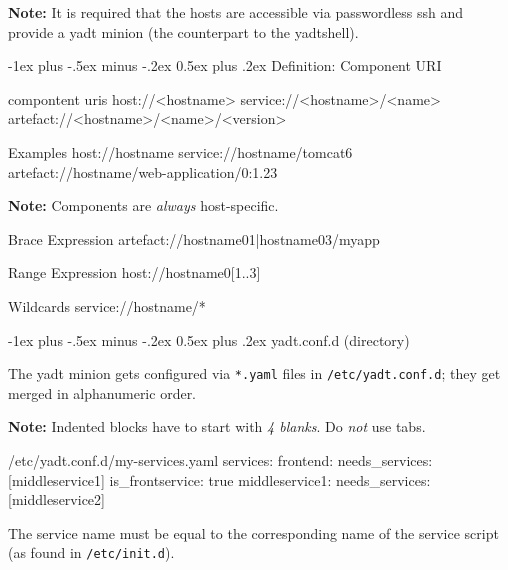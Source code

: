 \documentclass[10pt,landscape]{article}
\makeatletter
\renewcommand{\section}{\@startsection{section}{1}{0mm}%
                                {-1ex plus -.5ex minus -.2ex}%
                                {0.5ex plus .2ex}%
                                {\normalfont\large\bfseries}}
\newcommand{\note}[1]{\medskip\textbf{Note:} {#1}\medskip}
\makeatother
\begin{document}
\begin{multicols}{3}
\note{It is required that the hosts are accessible
via passwordless ssh and provide a yadt minion (the counterpart to the yadtshell).}



\section{Definition: Component URI}

\begin{commands}{compontent uris}
host://<hostname>
service://<hostname>/<name>
artefact://<hostname>/<name>/<version>
\end{commands}

\begin{examples}{Examples}
host://hostname
service://hostname/tomcat6
artefact://hostname/web-application/0:1.23
\end{examples}

\note{Components are \emph{always} host-specific.}

\begin{examples}{Brace Expression}
artefact://{hostname01|hostname03}/myapp
\end{examples}

\begin{examples}{Range Expression}
host://hostname0[1..3]
\end{examples}

\begin{examples}{Wildcards}
service://hostname/*
\end{examples}



\section{yadt.conf.d (directory)}

The yadt minion gets configured via \verb+*.yaml+ files in \verb+/etc/yadt.conf.d+;
they get merged in alphanumeric order.

\note{Indented blocks have to start with \emph{4 blanks}. Do \emph{not} use tabs.}

\begin{examples}[showspaces=true]{/etc/yadt.conf.d/my-services.yaml}
services:
    frontend:
        needs_services: [middleservice1]
        is_frontservice: true
    middleservice1:
        needs_services: [middleservice2]
\end{examples}

The service name must be equal to the corresponding name of the
service script (as found in \verb+/etc/init.d+).


\end{multicols}
\end{document}
